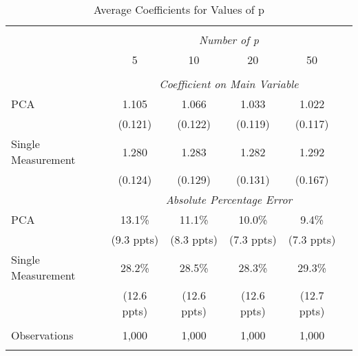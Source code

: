 \begin{table}[!htbp] \centering
  \caption{Average Coefficients for Values of p \label{sim_p_2}}
\begin{tabular}{@{\extracolsep{5pt}}lccccc}
\\[-1.8ex]\hline
\hline \\[-1.8ex]
& \multicolumn{5}{c}{\textit{Number of p}} \
\cr 
\\[-1.8ex] & 5 & 10 & 20 & 50 \\
\hline \\[-1.8ex]
& \multicolumn{5}{c}{\textit{Coefficient on Main Variable}} \\
 PCA & 1.105 & 1.066 & 1.033 & 1.022  \\
  & (0.121) & (0.122) & (0.119) & (0.117)\\
  Single Measurement & 1.280 & 1.283 & 1.282 & 1.292  \\
  & (0.124) & (0.129) & (0.131) & (0.167)\\
& \multicolumn{5}{c}{\textit{Absolute Percentage Error}} \\
  PCA & 13.1\% & 11.1\% & 10.0\% & 9.4\%  \\
   & (9.3 ppts) & (8.3 ppts) & (7.3 ppts) & (7.3 ppts)\\
  Single Measurement & 28.2\% & 28.5\% & 28.3\% & 29.3\%  \\
  & (12.6 ppts) & (12.6 ppts) & (12.6 ppts) & (12.7 ppts)\\
\hline \\[-1.8ex]
 Observations & 1,000 & 1,000 & 1,000 & 1,000 & \\
\hline
\hline \\[-1.8ex]
\end{tabular}
\end{table}